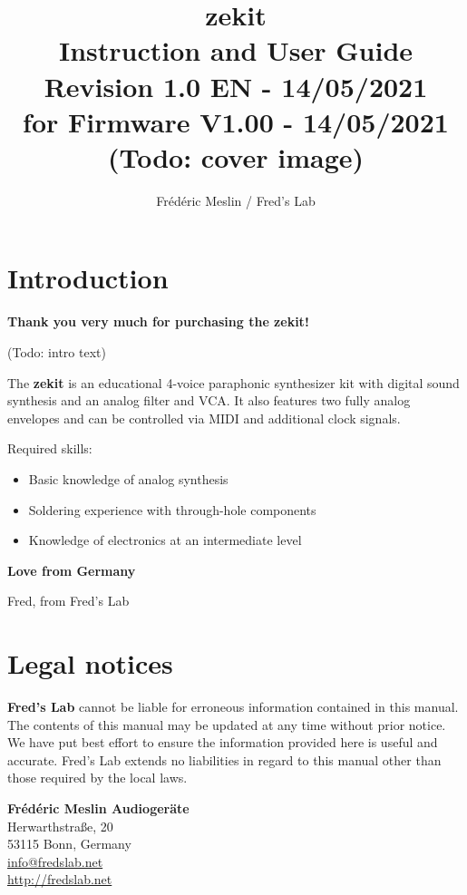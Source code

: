 \documentclass{scrartcl}
\title{
    \vspace*{4cm}
    \huge{zekit} \\
    Instruction and User Guide \\
    \vspace*{0.25cm}
    \small{Revision 1.0 EN - 14/05/2021} \\
    \small{for Firmware V1.00 - 14/05/2021} \\
    \vspace*{0.5cm}
    (Todo: cover image)
}
\author{Frédéric Meslin / Fred's Lab}
\begin{document}
\maketitle

\pagebreak


\section*{Introduction}

\textbf{Thank you very much for purchasing the zekit!}

(Todo: intro text)

The \textbf{zekit} is an educational 4-voice paraphonic synthesizer kit with digital sound synthesis and an analog filter and VCA. It also features two fully analog envelopes and can be controlled via MIDI and additional clock signals.

Required skills:

\begin{itemize}
    \item Basic knowledge of analog synthesis
    \item Soldering experience with through-hole components
    \item Knowledge of electronics at an intermediate level
\end{itemize}

\textbf{Love from Germany}
\begin{flushright}
    Fred, from Fred's Lab
\end{flushright}

\section*{Legal notices}
\textbf{Fred's Lab} cannot be liable for erroneous information contained in this manual. The contents of this manual may be updated at any time without prior notice. We have put best effort to ensure the information provided here is useful and accurate. Fred's Lab extends no liabilities in regard to this manual other than those required by the local laws.

\begin{center}
    \textbf{Frédéric Meslin Audiogeräte} \\
    Herwarthstraße, 20 \\
    53115 Bonn, Germany \\
    \url{info@fredslab.net} \\
    \url{http://fredslab.net} \\
\end{center}
\end{document}
